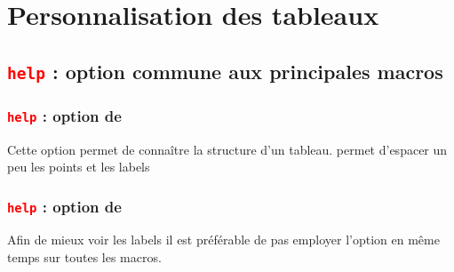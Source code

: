 %
\section{Personnalisation des tableaux}\label{pers}

\subsection{\texttt{\textcolor{red}{help}} :  option commune aux principales macros}

\subsubsection{\texttt{\textcolor{red}{help}} :  option de }
Cette option permet de connaître la structure d'un tableau.  permet d'espacer un peu les points et les labels

\begin{tkzexample}[small]
\end{tkzexample}

 
\subsubsection{\texttt{\textcolor{red}{help}} :  option de }
Afin de mieux voir les labels il est préférable de pas employer l'option  en même temps sur toutes les macros. 
\begin{tkzexample}[small]
\end{tkzexample}

